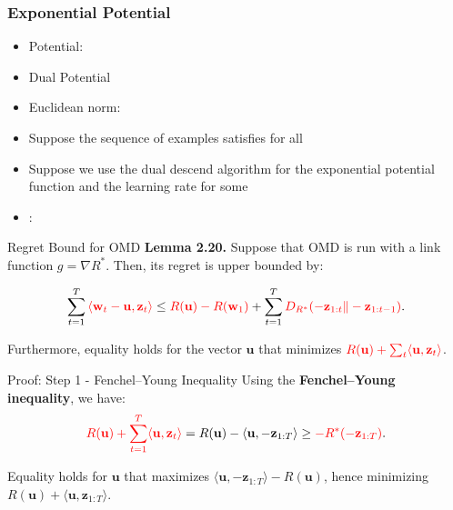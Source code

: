 \documentclass[handout]{beamer}
\begin{document}
\begin{frame}
\frametitle{Exponential Potential}
  \begin{itemize}
  \item Potential: 
  \item Dual Potential 
  \item Euclidean norm: 
  \item Suppose the sequence of examples
     satisfies  for all 
  \item Suppose we use the dual descend algorithm for the exponential potential
    function \R{$\Phi$} and the learning rate   for some 
  \item {}:\\
  \end{itemize}
\end{frame}

\begin{frame}{Regret Bound for OMD}
\textbf{Lemma 2.20.} Suppose that OMD is run with a link function \( g = \nabla R^* \). Then, its regret is upper bounded by:

\[
\sum_{t=1}^{T} \textcolor{mathcolor}{ \langle \mathbf{w}_t - \mathbf{u}, \mathbf{z}_t \rangle }
\leq \textcolor{mathcolor}{ R(\mathbf{u}) - R(\mathbf{w}_1) }
+ \sum_{t=1}^{T} \textcolor{mathcolor}{ D_{R^*}(-\mathbf{z}_{1:t} \| -\mathbf{z}_{1:t-1}) }.
\]

Furthermore, equality holds for the vector \( \mathbf{u} \) that minimizes \( \textcolor{mathcolor}{ R(\mathbf{u}) + \sum_t \langle \mathbf{u}, \mathbf{z}_t \rangle } \).
\end{frame}

\begin{frame}{Proof: Step 1 - Fenchel–Young Inequality}
Using the \textbf{Fenchel–Young inequality}, we have:
\[
\textcolor{mathcolor}{ R(\mathbf{u}) + \sum_{t=1}^{T} \langle \mathbf{u}, \mathbf{z}_t \rangle }
= R(\mathbf{u}) - \langle \mathbf{u}, -\mathbf{z}_{1:T} \rangle
\geq \textcolor{mathcolor}{ -R^*(-\mathbf{z}_{1:T}) }.
\]

Equality holds for \( \mathbf{u} \) that maximizes \( \langle \mathbf{u}, -\mathbf{z}_{1:T} \rangle - R(\mathbf{u}) \), hence minimizing \( R(\mathbf{u}) + \langle \mathbf{u}, \mathbf{z}_{1:T} \rangle \).
\end{frame}
\end{document}

